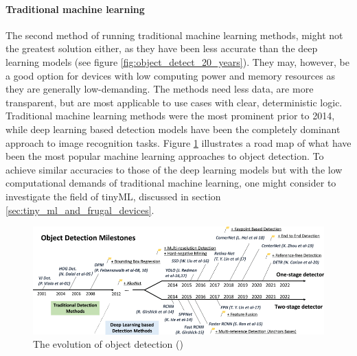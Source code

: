 \paragraph{Traditional machine learning}
The second method of running traditional machine learning methods, might not the greatest solution either, as they have been less accurate than the deep learning models (see figure \ref{fig:object_detect_20_years}). They may, however, be a good option for devices with low computing power and memory resources as they are generally low-demanding. The methods need less data, are more transparent, but are most applicable to use cases with clear, deterministic logic. Traditional machine learning methods were the most prominent prior to 2014, while deep learning based detection models have been the completely dominant approach to image recognition tasks. Figure \ref{fig:road_map} illustrates a road map of what have been the most popular machine learning approaches to object detection. To achieve similar accuracies to those of the deep learning models but with the low computational demands of traditional machine learning, one might consider to investigate the field of tinyML, discussed in section \ref{sec:tiny_ml_and_frugal_devices}.

\begin{figure}[H]
    \centering
    \includegraphics[width=1\linewidth]{Images/Diagrams/object_detection_directions.png}
    \caption{The evolution of object detection (\cite{zou2023object_detection_in_20_years})}
    \label{fig:road_map}
\end{figure}

